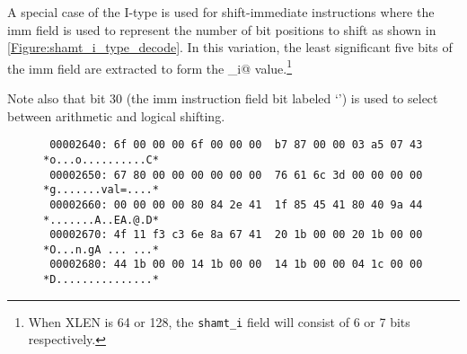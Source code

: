 A special case of the I-type is used for shift-immediate instructions 
where the imm field is used to represent the number of bit positions 
to shift as shown in \autoref{Figure:shamt_i_type_decode}.
In this variation, the least significant five bits of the imm field are 
extracted to form the \verb@shamt_i@ 
value.\footnote{When XLEN is 64 or 128, the {\tt shamt\_i} field will 
consist of 6 or 7 bits respectively.}

Note also that bit 30 (the imm instruction field bit labeled `\verb@b@') is used to select 
between arithmetic and logical shifting.

\begin{figure}[ht]
\centering
\DrawInsnOpIShiftTypeDecoding
{}
\label{Figure:shamt_i_type_decode}
\label{shamt.i:decode}
\end{figure}


\begin{figure}[ht]
\centering
\begin{verbatim}
 00002640: 6f 00 00 00 6f 00 00 00  b7 87 00 00 03 a5 07 43 *o...o..........C*
 00002650: 67 80 00 00 00 00 00 00  76 61 6c 3d 00 00 00 00 *g.......val=....*
 00002660: 00 00 00 00 80 84 2e 41  1f 85 45 41 80 40 9a 44 *.......A..EA.@.D*
 00002670: 4f 11 f3 c3 6e 8a 67 41  20 1b 00 00 20 1b 00 00 *O...n.gA ... ...*
 00002680: 44 1b 00 00 14 1b 00 00  14 1b 00 00 04 1c 00 00 *D...............*
\end{verbatim}
\label{Figure:imm:memory:dump}
\end{figure}


